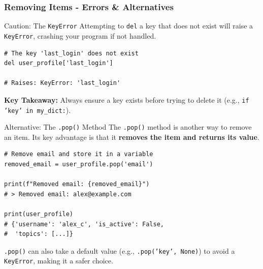 \documentclass{beamer}
\begin{document}
\begin{frame}[fragile]
    \frametitle{Removing Items - Errors \& Alternatives}

    \begin{block}{Caution: The \texttt{KeyError}}
        Attempting to \texttt{del} a key that does not exist will raise a \texttt{KeyError}, crashing your program if not handled.
\begin{verbatim}
# The key 'last_login' does not exist
del user_profile['last_login']

# Raises: KeyError: 'last_login'
\end{verbatim}
        \textbf{Key Takeaway:} Always ensure a key exists before trying to delete it (e.g., \texttt{if 'key' in my\_dict:}).
    \end{block}

    \begin{block}{Alternative: The \texttt{.pop()} Method}
        The \texttt{.pop()} method is another way to remove an item. Its key advantage is that it \textbf{removes the item and returns its value}.
\begin{verbatim}
# Remove email and store it in a variable
removed_email = user_profile.pop('email')

print(f"Removed email: {removed_email}")
# > Removed email: alex@example.com

print(user_profile)
# {'username': 'alex_c', 'is_active': False, 
#  'topics': [...]}
\end{verbatim}
        \texttt{.pop()} can also take a default value (e.g., \texttt{.pop('key', None)}) to avoid a \texttt{KeyError}, making it a safer choice.
    \end{block}
\end{frame}
\end{document}
